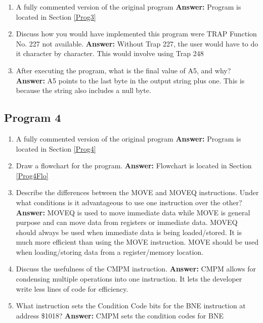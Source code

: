 \documentclass[12pt, twocolumn]{article}
\begin{document}
\begin{enumerate}
	\item A fully commented version of the original program
	\subitem \hspace{-0.7cm}\textbf{Answer:} Program is located in Section \ref{Prog3}
	\item Discuss how you would have implemented this program were TRAP Function No. 227 not available.
	\subitem \hspace{-0.7cm}\textbf{Answer:} Without Trap 227, the user would have to do it character by character. This would involve using Trap 248
	\item After executing the program, what is the final value of A5, and why?
	\subitem \hspace{-0.7cm}\textbf{Answer:} A5 points to the last byte in the output string plus one. This is because the string also includes a null byte.
\end{enumerate}

\subsection{Program 4}

\begin{enumerate}
	\item A fully commented version of the original program
	\subitem \hspace{-0.7cm}\textbf{Answer:} Program is located in Section \ref{Prog4}
	\item Draw a flowchart for the program.
	\subitem \hspace{-0.7cm}\textbf{Answer:} Flowchart is located in Section \ref{Prog4Flo}
	\item Describe the differences between the MOVE and MOVEQ instructions. Under what conditions is it advantageous to use one instruction over the other?
	\subitem \hspace{-0.7cm}\textbf{Answer:} MOVEQ is used to move immediate data while MOVE is general purpose and can move data from registers or immediate data. MOVEQ should always be used when immediate data is being loaded/stored. It is much more efficient than using the MOVE instruction. MOVE should be used when loading/storing data from a register/memory location.
	\item Discuss the usefulness of the CMPM instruction.
	\subitem \hspace{-0.7cm}\textbf{Answer:} CMPM allows for condensing multiple operations into one instruction. It lets the developer write less lines of code for efficiency.
	\item What instruction sets the Condition Code bits for the BNE instruction at address \$1018?
	\subitem \hspace{-0.7cm}\textbf{Answer:} CMPM sets the condition codes for BNE
\end{enumerate}
\end{document}

